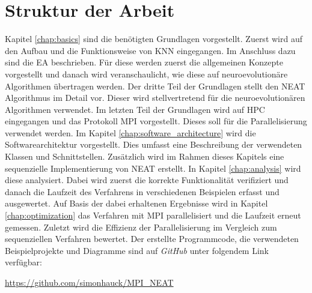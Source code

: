 \section{Struktur der Arbeit}
Kapitel \ref{chap:basics} sind die benötigten Grundlagen vorgestellt. Zuerst wird auf den Aufbau und die Funktionsweise von \ac{KNN} eingegangen. Im Anschluss dazu sind die \ac{EA} beschrieben. Für diese werden zuerst die allgemeinen Konzepte vorgestellt und danach wird veranschaulicht, wie diese auf neuroevolutionäre Algorithmen übertragen werden. Der dritte Teil der Grundlagen stellt den \ac{NEAT} Algorithmus im Detail vor. Dieser wird stellvertretend für die neuroevolutionären Algorithmen verwendet. Im letzten Teil der Grundlagen wird auf \ac{HPC} eingegangen und das Protokoll \ac{MPI} vorgestellt. Dieses soll für die Parallelisierung verwendet werden. Im Kapitel \ref{chap:software_architecture} wird die Softwarearchitektur vorgestellt. Dies umfasst eine Beschreibung der verwendeten Klassen und Schnittstellen. Zusätzlich wird im Rahmen dieses Kapitels eine sequenzielle Implementierung von \ac{NEAT} erstellt. In Kapitel \ref{chap:analysis} wird diese analysiert. Dabei wird zuerst die korrekte Funktionalität verifiziert und danach die Laufzeit des Verfahrens in verschiedenen Beispielen erfasst und ausgewertet. Auf Basis der dabei erhaltenen Ergebnisse wird in Kapitel \ref{chap:optimization} das Verfahren mit \ac{MPI} parallelisiert und die Laufzeit erneut gemessen. Zuletzt wird die Effizienz der Parallelisierung im Vergleich zum sequenziellen Verfahren bewertet. Der erstellte Programmcode, die verwendeten Beispielprojekte und Diagramme sind auf \emph{GitHub} unter folgendem Link verfügbar:
\begin{center}
	\url{https://github.com/simonhauck/MPI_NEAT}
\end{center}



\acresetall